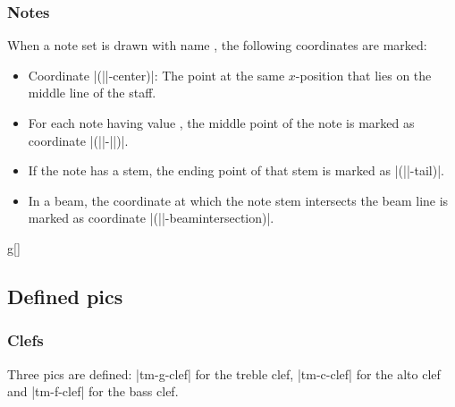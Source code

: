 \documentclass[11pt,a4paper]{ltxdoc}
\begin{document}
\subsubsection{Notes}\label{sec:tikz:coordinates:notes}
When a note set is drawn with name , the following coordinates are 
marked:
\begin{itemize}
  \item Coordinate |(||-center)|: The point at the same $x$-position 
  that lies on the middle line of the staff.
  \item For each note having value , the middle point of the 
  note is marked as coordinate |(||-||)|.
  \item If the note has a stem, the ending point of that stem is marked as 
  |(||-tail)|.
  \item In a beam, the coordinate at which the note stem intersects the beam 
  line is marked as coordinate |(||-beamintersection)|.
\end{itemize}
\begin{dispExample}
\begin{tmsinglestaff}
  \begin{tmstaff}{g}[]
    \begin{tmbeam}
    \end{tmbeam}
  \end{tmstaff}%
\end{tmsinglestaff}
\end{dispExample}
\subsection{Defined pics}\label{sec:tikz:pic}
\subsubsection{Clefs}\label{sec:tikz:pic:clefs}
Three pics are defined: |tm-g-clef| for the treble clef, |tm-c-clef| for the alto clef 
and |tm-f-clef| for the bass clef. 
\end{document}
